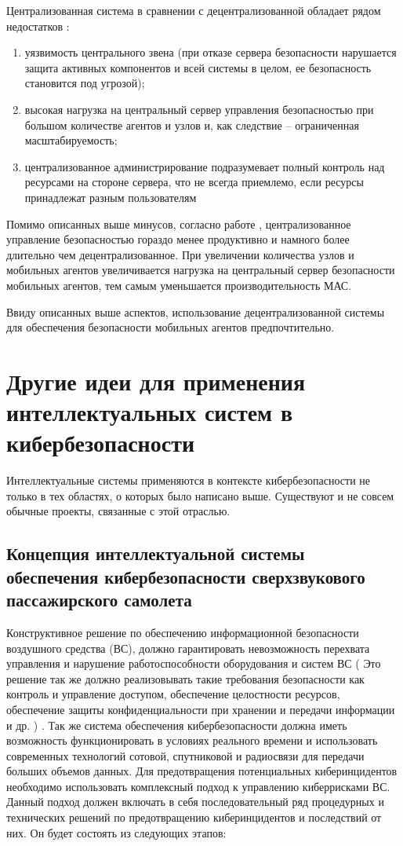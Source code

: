 Централизованная система в сравнении с децентрализованной обладает рядом недостатков \cite{probs}: %
\begin{enumerate}
    \item уязвимость центрального звена (при отказе сервера безопасности
    нарушается защита активных компонентов и всей системы в целом, ее безопасность становится под угрозой);
    \item высокая нагрузка на центральный сервер управления безопасностью при большом количестве агентов
    и узлов и, как следствие – ограниченная масштабируемость;
    \item централизованное администрирование подразумевает полный контроль над ресурсами на стороне сервера,
    что не всегда приемлемо, если ресурсы принадлежат разным пользователям
\end{enumerate}

Помимо описанных выше минусов, согласно работе \cite{mob}, централизованное управление безопасностью
гораздо менее продуктивно и намного более длительно чем децентрализованное. При увеличении количества
узлов и мобильных агентов увеличивается нагрузка на центральный
сервер безопасности мобильных агентов, тем самым уменьшается производительность МАС.

Ввиду описанных выше аспектов, использование децентрализованной системы для обеспечения
безопасности мобильных агентов предпочтительно.

\newpage
\section{Другие идеи для применения интеллектуальных систем в кибербезопасности}
Интеллектуальные системы применяются в контексте кибербезопасности не только в тех областях, о которых было
написано выше. Существуют и не совсем обычные проекты, связанные с этой отраслью.

\subsection{Концепция интеллектуальной системы обеспечения кибербезопасности сверхзвукового
пассажирского самолета}
Конструктивное решение по обеспечению информационной безопасности воздушного средства (ВС), должно гарантировать
невозможность перехвата управления и нарушение работоспособности оборудования и систем ВС (
Это решение так же должно реализовывать такие требования безопасности как контроль и управление доступом,
обеспечение целостности ресурсов, обеспечение защиты конфиденциальности при хранении и передачи информации
и др.
) \cite{concept}. Так же система обеспечения кибербезопасности должна иметь возможность функционировать в
условиях реального времени и использовать современных технологий сотовой, спутниковой и
радиосвязи для передачи больших объемов данных.
Для предотвращения потенциальных киберинцидентов необходимо использовать комплексный подход
к управлению киберрисками ВС. Данный подход должен включать в себя последовательный ряд процедурных
и технических решений по предотвращению киберинцидентов и последствий от них.
Он будет состоять из следующих этапов:

